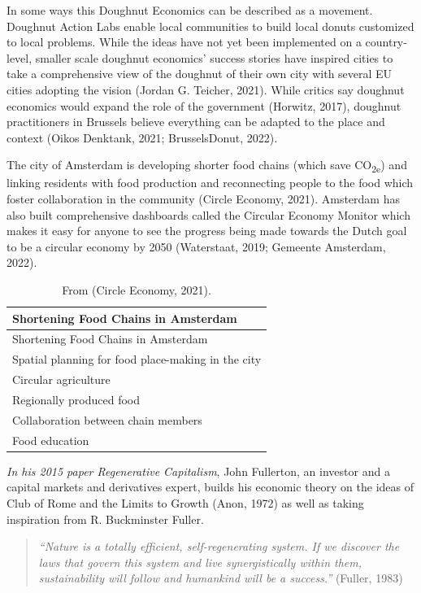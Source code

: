 \documentclass[
  letterpaper,
  DIV=11,
  numbers=noendperiod]{scrartcl}
\begin{document}
In some ways this Doughnut Economics can be described as a movement.
Doughnut Action Labs enable local communities to build local donuts
customized to local problems. While the ideas have not yet been
implemented on a country-level, smaller scale doughnut economics'
success stories have inspired cities to take a comprehensive view of the
doughnut of their own city with several EU cities adopting the vision
(Jordan G. Teicher, 2021). While critics say doughnut economics would
expand the role of the government (Horwitz, 2017), doughnut
practitioners in Brussels believe everything can be adapted to the place
and context (Oikos Denktank, 2021; BrusselsDonut, 2022).

The city of Amsterdam is developing shorter food chains (which save
CO\textsubscript{2e}) and linking residents with food production and
reconnecting people to the food which foster collaboration in the
community (Circle Economy, 2021). Amsterdam has also built comprehensive
dashboards called the Circular Economy Monitor which makes it easy for
anyone to see the progress being made towards the Dutch goal to be a
circular economy by 2050 (Waterstaat, 2019; Gemeente Amsterdam, 2022).

\begin{longtable}[]{@{}l@{}}
\caption{From (Circle Economy, 2021).}\tabularnewline
\toprule\noalign{}
Shortening Food Chains in Amsterdam \\
\midrule\noalign{}
\endfirsthead
\toprule\noalign{}
Shortening Food Chains in Amsterdam \\
\midrule\noalign{}
\endhead
\bottomrule\noalign{}
\endlastfoot
Spatial planning for food place-making in the city \\
Circular agriculture \\
Regionally produced food \\
Collaboration between chain members \\
Food education \\
\end{longtable}

\emph{In his 2015 paper Regenerative Capitalism}, John Fullerton, an
investor and a capital markets and derivatives expert, builds his
economic theory on the ideas of Club of Rome and the Limits to Growth
(Anon, 1972) as well as taking inspiration from R. Buckminster Fuller.

\begin{quote}
\emph{``Nature is a totally efficient, self-regenerating system. If we
discover the laws that govern this system and live synergistically
within them, sustainability will follow and humankind will be a
success.''} (Fuller, 1983)
\end{quote}
\end{document}
